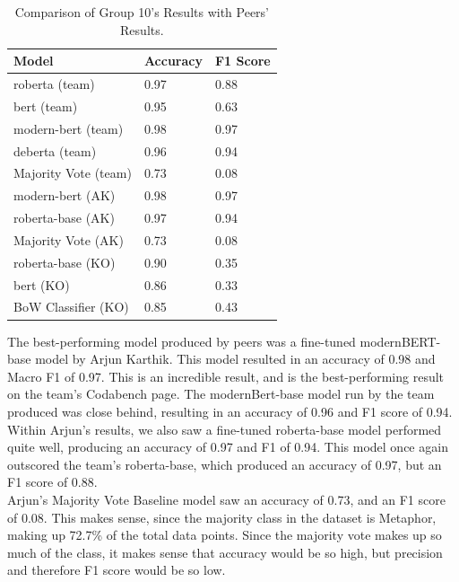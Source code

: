 \documentclass[11pt]{article}
\begin{document}
\begin{table}[h]
  \centering
  \begin{tabular}{lll}
    \hline
    \textbf{Model} & \textbf{Accuracy} & \textbf{F1 Score} \\
    \hline
    roberta (team)    &   0.97   &   0.88   \\
    bert (team)   &   0.95   &   0.63   \\
    modern-bert (team)      &   0.98   &   0.97  \\
    deberta (team)   &   0.96   &   0.94   \\
    Majority Vote (team)   &   0.73   &   0.08   \\
    \hline
    modern-bert (AK) & 0.98 & 0.97 \\
    roberta-base (AK) & 0.97 & 0.94 \\
    Majority Vote (AK) & 0.73 & 0.08 \\
    \hline
    roberta-base (KO) & 0.90 & 0.35 \\
    bert (KO) & 0.86 & 0.33 \\
    BoW Classifier (KO) & 0.85 & 0.43 \\
    \hline
  \end{tabular}
  \caption{\label{tuning_results_compare}
    Comparison of Group 10's Results with Peers' Results. \newline
  }
\end{table} 

The best-performing model produced by peers was a fine-tuned modernBERT-base model by Arjun Karthik. This model resulted in an accuracy of 0.98 and Macro F1 of 0.97. This is an incredible result, and is the best-performing result on the team's Codabench page. The modernBert-base model run by the team produced was close behind, resulting in an accuracy of 0.96 and F1 score of 0.94.\\ 

Within Arjun's results, we also saw a fine-tuned roberta-base model performed quite well, producing an accuracy of 0.97 and F1 of 0.94. This model once again outscored the team's roberta-base, which produced an accuracy of 0.97, but an F1 score of 0.88. \\

Arjun's Majority Vote Baseline model saw an accuracy of 0.73, and an F1 score of 0.08. This makes sense, since the majority class in the dataset is Metaphor, making up 72.7\% of the total data points. Since the majority vote makes up so much of the class, it makes sense that accuracy would be so high, but precision and therefore F1 score would be so low. \\
\end{document}
